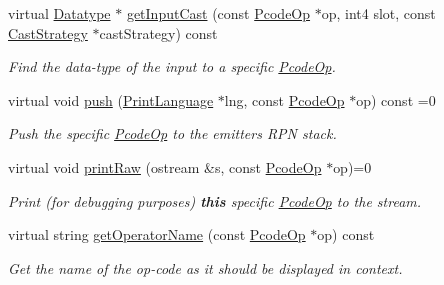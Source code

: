 \begin{DoxyCompactItemize}
virtual \mbox{\hyperlink{class_datatype}{Datatype}} $\ast$ \mbox{\hyperlink{class_type_op_a950c417e4af100d176a701af5816b5ab}{get\+Input\+Cast}} (const \mbox{\hyperlink{class_pcode_op}{Pcode\+Op}} $\ast$op, int4 slot, const \mbox{\hyperlink{class_cast_strategy}{Cast\+Strategy}} $\ast$cast\+Strategy) const
\begin{DoxyCompactList}\small\item\em Find the data-\/type of the input to a specific \mbox{\hyperlink{class_pcode_op}{Pcode\+Op}}. \end{DoxyCompactList}\item 
virtual void \mbox{\hyperlink{class_type_op_ac9c9544203ed74dabe6ac662b653b2af}{push}} (\mbox{\hyperlink{class_print_language}{Print\+Language}} $\ast$lng, const \mbox{\hyperlink{class_pcode_op}{Pcode\+Op}} $\ast$op) const =0
\begin{DoxyCompactList}\small\item\em Push the specific \mbox{\hyperlink{class_pcode_op}{Pcode\+Op}} to the emitter\textquotesingle{}s R\+PN stack. \end{DoxyCompactList}\item 
virtual void \mbox{\hyperlink{class_type_op_a60717e486917a30cc7cb6e3ce02585e1}{print\+Raw}} (ostream \&s, const \mbox{\hyperlink{class_pcode_op}{Pcode\+Op}} $\ast$op)=0
\begin{DoxyCompactList}\small\item\em Print (for debugging purposes) {\bfseries{this}} specific \mbox{\hyperlink{class_pcode_op}{Pcode\+Op}} to the stream. \end{DoxyCompactList}\item 
virtual string \mbox{\hyperlink{class_type_op_a42a1ffa77f998df24efdb44405b33ac5}{get\+Operator\+Name}} (const \mbox{\hyperlink{class_pcode_op}{Pcode\+Op}} $\ast$op) const
\begin{DoxyCompactList}\small\item\em Get the name of the op-\/code as it should be displayed in context. \end{DoxyCompactList}\end{DoxyCompactItemize}
